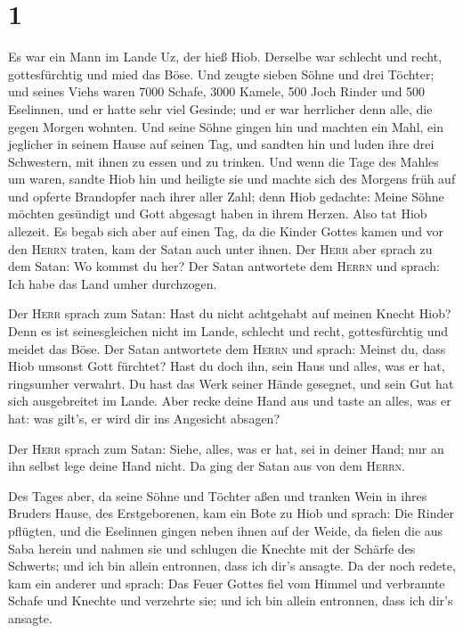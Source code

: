 \hypertarget{section}{%
\section{1}\label{section}}

 Es war ein Mann im Lande Uz, der hieß Hiob. Derselbe war
schlecht und recht, gottesfürchtig und mied das Böse.  Und
zeugte sieben Söhne und drei Töchter;  und seines Viehs
waren 7000 Schafe, 3000 Kamele, 500 Joch Rinder und 500 Eselinnen, und
er hatte sehr viel Gesinde; und er war herrlicher denn alle, die gegen
Morgen wohnten.  Und seine Söhne gingen hin und machten
ein Mahl, ein jeglicher in seinem Hause auf seinen Tag, und sandten hin
und luden ihre drei Schwestern, mit ihnen zu essen und zu trinken.
 Und wenn die Tage des Mahles um waren, sandte Hiob hin
und heiligte sie und machte sich des Morgens früh auf und opferte
Brandopfer nach ihrer aller Zahl; denn Hiob gedachte: Meine Söhne
möchten gesündigt und Gott abgesagt haben in ihrem Herzen. Also tat Hiob
allezeit.  Es begab sich aber auf einen Tag, da die Kinder
Gottes kamen und vor den \textsc{Herrn} traten, kam der Satan auch unter
ihnen.  Der \textsc{Herr} aber sprach zu dem Satan: Wo
kommst du her? Der Satan antwortete dem \textsc{Herrn} und sprach: Ich
habe das Land umher durchzogen.

 Der \textsc{Herr} sprach zum Satan: Hast du nicht
achtgehabt auf meinen Knecht Hiob? Denn es ist seinesgleichen nicht im
Lande, schlecht und recht, gottesfürchtig und meidet das Böse.
 Der Satan antwortete dem \textsc{Herrn} und sprach:
Meinst du, dass Hiob umsonst Gott fürchtet?  Hast du doch
ihn, sein Haus und alles, was er hat, ringsumher verwahrt. Du hast das
Werk seiner Hände gesegnet, und sein Gut hat sich ausgebreitet im Lande.
 Aber recke deine Hand aus und taste an alles, was er
hat: was gilt's, er wird dir ins Angesicht absagen?

 Der \textsc{Herr} sprach zum Satan: Siehe, alles, was er
hat, sei in deiner Hand; nur an ihn selbst lege deine Hand nicht. Da
ging der Satan aus von dem \textsc{Herrn}.

 Des Tages aber, da seine Söhne und Töchter aßen und
tranken Wein in ihres Bruders Hause, des Erstgeborenen, 
kam ein Bote zu Hiob und sprach: Die Rinder pflügten, und die Eselinnen
gingen neben ihnen auf der Weide,  da fielen die aus Saba
herein und nahmen sie und schlugen die Knechte mit der Schärfe des
Schwerts; und ich bin allein entronnen, dass ich dir's ansagte.
 Da der noch redete, kam ein anderer und sprach: Das
Feuer Gottes fiel vom Himmel und verbrannte Schafe und Knechte und
verzehrte sie; und ich bin allein entronnen, dass ich dir's ansagte.

